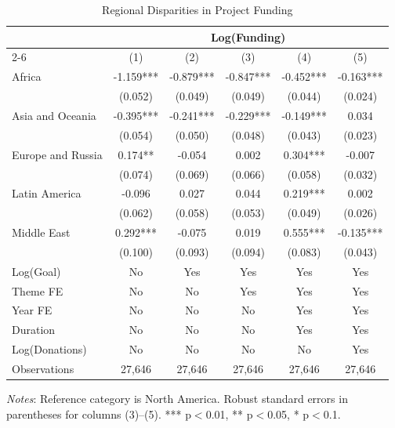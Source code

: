 \begin{table}[htbp]
\centering
\caption{Regional Disparities in Project Funding}
\label{tab:regional_regression}
\begin{threeparttable}
\begin{tabular}{lccccc}
\toprule
& \multicolumn{5}{c}{Log(Funding)} \\
\cmidrule(lr){2-6}
& (1) & (2) & (3) & (4) & (5) \\
\midrule
Africa & -1.159*** & -0.879*** & -0.847*** & -0.452*** & -0.163*** \\
& (0.052) & (0.049) & (0.049) & (0.044) & (0.024) \\
Asia and Oceania & -0.395*** & -0.241*** & -0.229*** & -0.149*** & 0.034 \\
& (0.054) & (0.050) & (0.048) & (0.043) & (0.023) \\
Europe and Russia & 0.174** & -0.054 & 0.002 & 0.304*** & -0.007 \\
& (0.074) & (0.069) & (0.066) & (0.058) & (0.032) \\
Latin America & -0.096 & 0.027 & 0.044 & 0.219*** & 0.002 \\
& (0.062) & (0.058) & (0.053) & (0.049) & (0.026) \\
Middle East & 0.292*** & -0.075 & 0.019 & 0.555*** & -0.135*** \\
& (0.100) & (0.093) & (0.094) & (0.083) & (0.043) \\
\midrule
Log(Goal) & No & Yes & Yes & Yes & Yes \\
Theme FE & No & No & Yes & Yes & Yes \\
Year FE & No & No & No & Yes & Yes \\
Duration & No & No & No & Yes & Yes \\
Log(Donations) & No & No & No & No & Yes \\
\midrule
Observations & 27,646 & 27,646 & 27,646 & 27,646 & 27,646 \\
\bottomrule
\end{tabular}
\begin{tablenotes}
\small
\item \textit{Notes}: Reference category is North America. Robust standard errors in parentheses for columns (3)--(5). *** p$<$0.01, ** p$<$0.05, * p$<$0.1.
\end{tablenotes}
\end{threeparttable}
\end{table}

